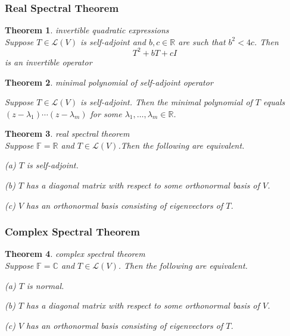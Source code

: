 \documentclass{article}
\newtheorem{theorem}{Theorem}[subsection]
\newcommand{\RR}{\mathbb{R}}
\newcommand{\CC}{\mathbb{C}}
\newcommand{\FF}{\mathbb{F}}
\begin{document}
\begin{CJK}{UTF8}{gkai}
\subsubsection{Real Spectral Theorem}

\begin{theorem}
    invertible quadratic expressions\\

    Suppose $T \in \mathcal{L}(V)$ is self-adjoint and $b,c \in \RR$ are such that $b^2 < 4c$. Then
    \[T^2 +bT+cI\]
    is an invertible operator
\end{theorem}

\begin{theorem}
    minimal polynomial of self-adjoint operator\

    Suppose $T \in \mathcal{L}(V)$ is self-adjoint. Then the minimal polynomial of $T$ equals
    $(z - \lambda_1)\cdots(z- \lambda_m)$ for some $\lambda_1,\ldots, \lambda_m \in \RR$.
\end{theorem}

\begin{theorem}
    real spectral theorem\\

    Suppose $\FF=\RR$ and $T\in\mathcal{L}(V)$.Then the following are equivalent.
    
    (a) $T$ is self-adjoint.

    (b) $T$ has a diagonal matrix with respect to some orthonormal basis of $V$.

    (c) $V$ has an orthonormal basis consisting of eigenvectors of $T$.
\end{theorem}

\subsubsection{Complex Spectral Theorem}

\begin{theorem}
    complex spectral theorem\\

    Suppose $\FF = \CC$ and $T \in \mathcal{L}(V)$. Then the following are equivalent.

    (a) $T$ is normal.

    (b) $T$ has a diagonal matrix with respect to some orthonormal basis of $V$.

    (c) $V$ has an orthonormal basis consisting of eigenvectors of $T$.
\end{theorem}


\end{CJK}
\end{document}
